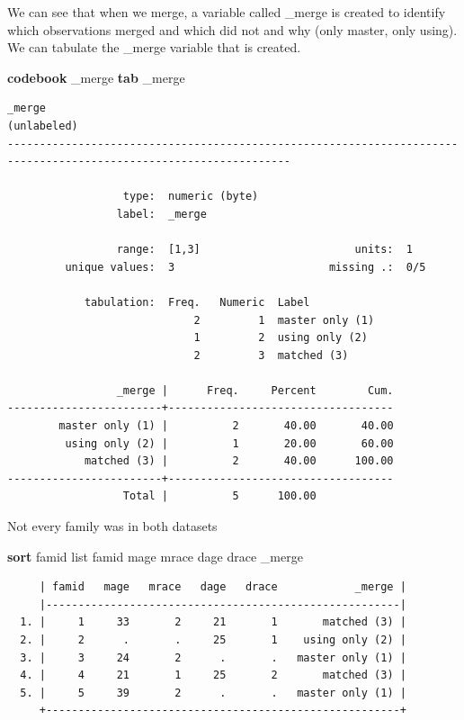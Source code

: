\documentclass[
]{book}
\newenvironment{Shaded}{\begin{snugshade}}{\end{snugshade}}
\newcommand{\DataTypeTok}[1]{\textcolor[rgb]{0.13,0.29,0.53}{#1}}
\newcommand{\KeywordTok}[1]{\textcolor[rgb]{0.13,0.29,0.53}{\textbf{#1}}}
\newcommand{\NormalTok}[1]{#1}
\newcommand{\OtherTok}[1]{\textcolor[rgb]{0.56,0.35,0.01}{#1}}
\begin{document}
We can see that when we merge, a variable called \_merge is created to identify which observations merged and which did not and why (only master, only using). We can tabulate the \_merge variable that is created.

\begin{Shaded}
\begin{Highlighting}[]
\KeywordTok{codebook} \DataTypeTok{\_merge}
\KeywordTok{tab} \DataTypeTok{\_merge}
\end{Highlighting}
\end{Shaded}

\begin{verbatim}
_merge                                                                                                 (unlabeled)
------------------------------------------------------------------------------------------------------------------

                  type:  numeric (byte)
                 label:  _merge

                 range:  [1,3]                        units:  1
         unique values:  3                        missing .:  0/5

            tabulation:  Freq.   Numeric  Label
                             2         1  master only (1)
                             1         2  using only (2)
                             2         3  matched (3)

                 _merge |      Freq.     Percent        Cum.
------------------------+-----------------------------------
        master only (1) |          2       40.00       40.00
         using only (2) |          1       20.00       60.00
            matched (3) |          2       40.00      100.00
------------------------+-----------------------------------
                  Total |          5      100.00
\end{verbatim}

Not every family was in both datasets

\begin{Shaded}
\begin{Highlighting}[]
\KeywordTok{sort}\NormalTok{ famid}
\OtherTok{list}\NormalTok{ famid mage mrace dage drace }\DataTypeTok{\_merge}
\end{Highlighting}
\end{Shaded}

\begin{verbatim}
     | famid   mage   mrace   dage   drace            _merge |
     |-------------------------------------------------------|
  1. |     1     33       2     21       1       matched (3) |
  2. |     2      .       .     25       1    using only (2) |
  3. |     3     24       2      .       .   master only (1) |
  4. |     4     21       1     25       2       matched (3) |
  5. |     5     39       2      .       .   master only (1) |
     +-------------------------------------------------------+
\end{verbatim}
\end{document}
